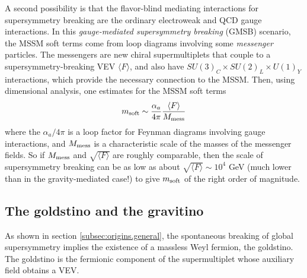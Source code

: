 \documentclass[12pt]{article}
\def\beq{\begin{eqnarray}}
\def\eeq{\end{eqnarray}}
\begin{document}
A second possibility is that the flavor-blind mediating interactions for
supersymmetry breaking are the ordinary electroweak and QCD gauge
interactions. In this {\it gauge-mediated supersymmetry breaking} (GMSB)
scenario, the MSSM soft terms come from loop diagrams involving some {\it
messenger} particles.  The messengers are new chiral supermultiplets that
couple to a supersymmetry-breaking VEV $\langle F\rangle$, and also have
$SU(3)_C \times SU(2)_L \times U(1)_Y$ interactions, which provide the
necessary connection to the MSSM. Then, using dimensional analysis, one 
estimates for the MSSM soft terms
\beq
m_{\rm soft} \sim {\alpha_a\over 4\pi} {\langle F \rangle
\over M_{\rm mess}}
\label{mgravgmsb}
\eeq
where the $\alpha_a/4\pi$ is a loop factor for Feynman diagrams involving
gauge interactions, and $M_{\rm mess}$ is a characteristic scale of the
masses of the messenger fields. So if $M_{\rm mess}$ and $\sqrt{\langle
F\rangle}$ are roughly comparable, then the scale of supersymmetry
breaking can be as low as about ${\sqrt{\langle F\rangle}} \sim 10^4$ GeV
(much lower than in the gravity-mediated case!) to give $m_{\rm soft}$ of
the right order of magnitude.

\subsection{The goldstino and the gravitino}\label{subsec:origins.gravitino}
\setcounter{equation}{0}
\setcounter{footnote}{1}

As shown in section \ref{subsec:origins.general}, the spontaneous breaking
of global supersymmetry implies the existence of a massless Weyl fermion,
the goldstino.  The goldstino is the fermionic component of the
supermultiplet whose auxiliary field obtains a VEV.
\end{document}
